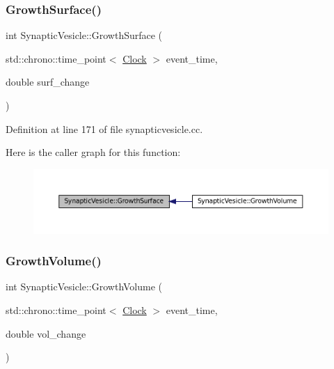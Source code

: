 \subsubsection{\texorpdfstring{Growth\+Surface()}{GrowthSurface()}}
{\footnotesize\ttfamily int Synaptic\+Vesicle\+::\+Growth\+Surface (\begin{DoxyParamCaption}\item[{std\+::chrono\+::time\+\_\+point$<$ \mbox{\hyperlink{universe_8h_a0ef8d951d1ca5ab3cfaf7ab4c7a6fd80}{Clock}} $>$}]{event\+\_\+time,  }\item[{double}]{surf\+\_\+change }\end{DoxyParamCaption})}



Definition at line 171 of file synapticvesicle.\+cc.

Here is the caller graph for this function\+:\nopagebreak
\begin{figure}[H]
\begin{center}
\leavevmode
\includegraphics[width=350pt]{class_synaptic_vesicle_a045f27b28b8b11edc884568b390c22fe_icgraph}
\end{center}
\end{figure}
\mbox{\label{class_synaptic_vesicle_a0d4a4a03405593b3abc0e734c1758830}} 
\subsubsection{\texorpdfstring{Growth\+Volume()}{GrowthVolume()}}
{\footnotesize\ttfamily int Synaptic\+Vesicle\+::\+Growth\+Volume (\begin{DoxyParamCaption}\item[{std\+::chrono\+::time\+\_\+point$<$ \mbox{\hyperlink{universe_8h_a0ef8d951d1ca5ab3cfaf7ab4c7a6fd80}{Clock}} $>$}]{event\+\_\+time,  }\item[{double}]{vol\+\_\+change }\end{DoxyParamCaption})}



